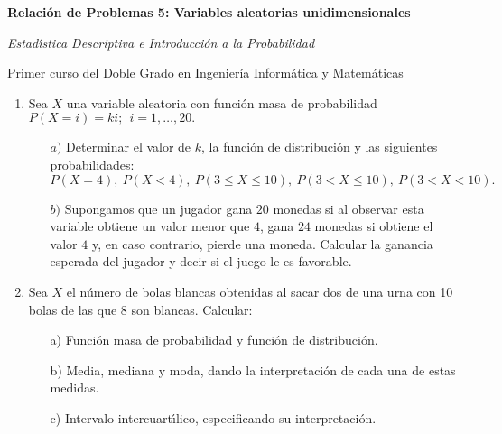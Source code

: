 \documentclass[11pt]{book}
\begin{document}
\centerline{\large \bf Relaci{\'o}n de Problemas 5: Variables aleatorias
unidimensionales}
\smallskip \centerline{\large \it Estad{\'\i}stica Descriptiva e Introducci{\'o}n a la
Probabilidad}

\centerline{Primer curso del Doble Grado en Ingenier\'ia Inform\'atica y
Matem{\'a}ticas} \hrulefill \vskip 0.5cm




\begin{enumerate}

\item Sea $X$ una variable aleatoria con funci{\'o}n masa de probabilidad
      $
      P(X = i)  = k  i ;\ \  i = 1, \ldots , 20.
      $
\begin{itemize}\item [$a)$]      Determinar el valor de $k$, la funci{\'o}n de distribuci{\'o}n y las siguientes
       probabilidades:
$$P(X=4) ,\  P(X<4) ,\  P(3 \leq X \leq 10) ,\
             P(3< X \leq 10) ,\  P(3<X<10).$$
\item [$b)$] Supongamos que un jugador gana $20$  monedas si al observar esta variable obtiene un
valor menor que $4$, gana  $24$ monedas si obtiene el valor $4$ y, en caso
contrario, pierde una moneda. Calcular la ganancia esperada del jugador y decir
si el juego le es favorable.
\end{itemize}
 \vskip 0.75cm \item Sea $X$ el n{\'u}mero de bolas blancas obtenidas al sacar dos de una urna con 10 bolas de las que 8 son blancas.
Calcular: \begin{itemize} \item [a)] Funci{\'o}n masa de probabilidad y  funci{\'o}n de
distribuci{\'o}n. \item [b)] Media, mediana y moda, dando la interpretaci{\'o}n de cada
una de estas medidas.\item [c)]Intervalo intercuart{\'\i}lico,  especificando  su
interpretaci{\'o}n.\end{itemize}


\end{enumerate}
\end{document}
